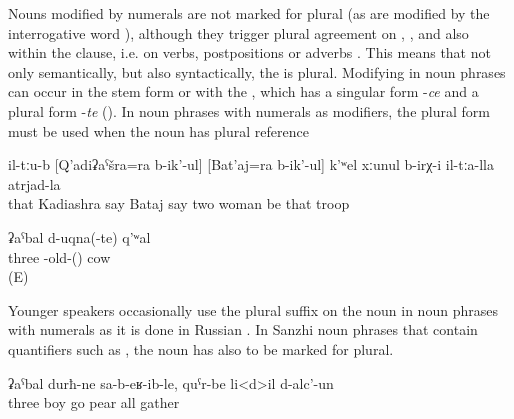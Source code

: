 Nouns modified by numerals are not marked for plural (as are  modified by the interrogative word  ), although they trigger plural agreement on  ,  , and also within the clause, i.e. on verbs, postpositions or adverbs . This means that not only semantically, but also syntactically, the  is plural. Modifying  in noun phrases can occur in the stem form or with the , which has a singular form -\textit{ce} and a plural form -\textit{te} (). In noun phrases with numerals as modifiers, the plural form must be used when the noun has plural reference 
%
\begin{exe}
	\ex	\label{ex:There were two women of their troops called Kadiashra and Bataj@5}
	\gll	il-tːu-b	[Q'adiʡaˁšra=ra	b-ik'-ul]	[Bat'aj=ra	b-ik'-ul]		k'ʷel	xːunul	b-irχ-i	il-tːa-lla	atrjad-la\\
		that	Kadiashra	say	Bataj	say		two	woman	be	that	troop\\
	\glt	{}
	
	\ex	\label{three old cowsNP}
	\gll ʡaˁbal	d-uqna(-te)	q'ʷal\\
	three	-old-() 	cow\\
	\glt	{} (E)
\end{exe}


Younger speakers occasionally use the plural suffix on the noun in noun phrases with numerals as it is done in Russian . In Sanzhi noun phrases that contain quantifiers such as   , the noun has also to be marked for plural.
%
\begin{exe}
	\ex	\label{ex:Three boys came and gathered all the pears@6}
	\gll	ʡaˁbal	durħ-ne	sa-b-eʁ-ib-le,	quˁr-be	li<d>il		d-alc'-un\\
		three	boy	go	pear	all	gather\\
	\glt	{}
\end{exe}




